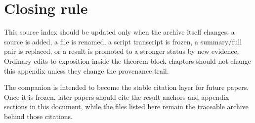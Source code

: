 \section{Closing rule}
\label{sec:source-index-closing-rule}

This source index should be updated only when the archive itself changes: a source is added, a file is renamed, a script transcript is frozen, a summary/full pair is replaced, or a result is promoted to a stronger status by new evidence.  Ordinary edits to exposition inside the theorem-block chapters should not change this appendix unless they change the provenance trail.

The companion is intended to become the stable citation layer for future papers.  Once it is frozen, later papers should cite the result anchors and appendix sections in this document, while the files listed here remain the traceable archive behind those citations.
